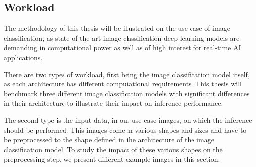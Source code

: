 \subsection{Workload}
\label{chap:workload}
The methodology of this thesis will be illustrated on the use case of image classification, as state of the art image classification deep learning models are demanding in computational power as well as of high interest for real-time AI applications.

There are two types of workload, first being the image classification model itself, as each architecture has different computational requirements.
This thesis will benchmark three different image classification models with significant differences in their architecture to illustrate their impact on inference performance.

The second type is the input data, in our use case images, on which the inference should be performed.
This images come in various shapes and sizes and have to be preprocessed to the shape defined in the architecture of the image classification model.
To study the impact of these various shapes on the preprocessing step, we present different example images in this section.

